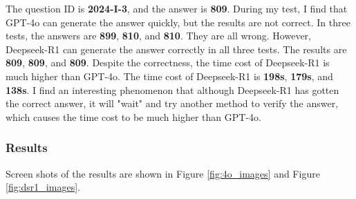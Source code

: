 \documentclass[a4paper,12pt]{article}
\begin{document}
The question ID is \textbf{2024-I-3}, and the answer is \textbf{809}. During my test, I find that GPT-4o can generate the answer quickly, but the results are not correct. In three tests, the answers are \textbf{899}, \textbf{810}, and \textbf{810}. They are all wrong. However, Deepseek-R1 can generate the answer correctly in all three tests. The results are \textbf{809}, \textbf{809}, and \textbf{809}. Despite the correctness, the time cost of Deepseek-R1 is much higher than GPT-4o. The time cost of Deepseek-R1 is \textbf{198s}, \textbf{179s}, and \textbf{138s}. I find an interesting phenomenon that although Deepseek-R1 has gotten the correct answer, it will "wait" and try another method to verify the answer, which causes the time cost to be much higher than GPT-4o. 

\subsubsection{Results}

Screen shots of the results are shown in Figure \ref{fig:4o_images} and Figure \ref{fig:dsr1_images}. 
\end{document}
